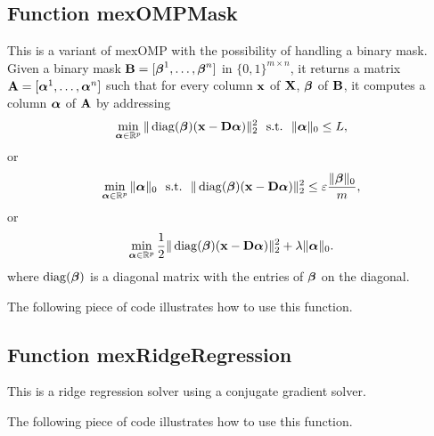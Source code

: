 \documentclass[a4paper, 11pt]{article}
\begin{document}
\subsection{Function mexOMPMask}
This is a variant of mexOMP with the possibility of handling a binary mask.
Given a binary mask ${\mathbf B}=[{\boldsymbol\beta}^1,\ldots,{\boldsymbol\beta}^n]$ in $\{0,1\}^{m \times n}$, it returns a matrix ${\mathbf A}=[{\boldsymbol\alpha}^1,\ldots,{\boldsymbol\alpha}^n]$ such that for every column ${\mathbf x}$ of ${\mathbf X}$, ${\boldsymbol\beta}$ of ${\mathbf B}$, it computes a column ${\boldsymbol\alpha}$ of ${\mathbf A}$ by addressing
\begin{equation}
\min_{{\boldsymbol\alpha} \in {\mathbb R}^p} \|\operatorname{diag}({\boldsymbol\beta})({\mathbf x}-{\mathbf D}{\boldsymbol\alpha})\|_2^2 ~~\text{s.t.}~~ \|{\boldsymbol\alpha}\|_0 \leq L,
   \end{equation}
   or
   \begin{equation}
   \min_{{\boldsymbol\alpha} \in {\mathbb R}^p}  \|{\boldsymbol\alpha}\|_0 ~~\text{s.t.}~~ \|\operatorname{diag}({\boldsymbol\beta})({\mathbf x}-{\mathbf D}{\boldsymbol\alpha})\|_2^2 \leq \varepsilon\frac{\|{\boldsymbol\beta}\|_0}{m},
   \end{equation}
   or
   \begin{equation}
   \min_{{\boldsymbol\alpha} \in {\mathbb R}^p} \frac{1}{2}\|\operatorname{diag}({\boldsymbol\beta})({\mathbf x}-{\mathbf D}{\boldsymbol\alpha})\|_2^2 +\lambda\|{\boldsymbol\alpha}\|_0.
   \end{equation}
   where $\operatorname{diag}({\boldsymbol\beta})$ is a diagonal matrix with the entries of ${\boldsymbol\beta}$ on the diagonal.


The following piece of code illustrates how to use this function.



\subsection{Function mexRidgeRegression}
This is a ridge regression solver using a conjugate gradient solver.

The following piece of code illustrates how to use this function.

\end{document}
